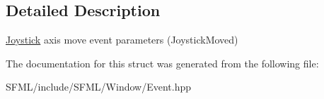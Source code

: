 \subsection{Detailed Description}
\mbox{\hyperlink{classsf_1_1_joystick}{Joystick}} axis move event parameters (Joystick\+Moved) 

\begin{DoxyVerb}\end{DoxyVerb}
 

The documentation for this struct was generated from the following file\+:\begin{DoxyCompactItemize}
\item 
S\+F\+M\+L/include/\+S\+F\+M\+L/\+Window/Event.\+hpp\end{DoxyCompactItemize}
